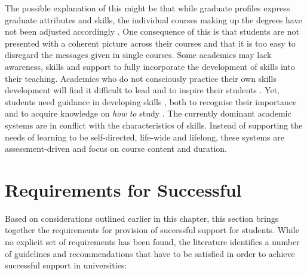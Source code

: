 The possible explanation of this might be that while graduate profiles express
graduate attributes and \LLLs skills, the individual courses making up the
degrees have not been adjusted accordingly \citep{Hughes2010}. One consequence
of this is that students are not presented with a coherent picture across their
courses and that it is too easy to disregard the messages given in single
courses. Some academics may lack awareness, skills and support to fully
incorporate the development of \LLLs skills into their teaching. Academics who
do not consciously practice their own \LLLs skills development will find it
difficult to lead and to inspire their students \citep{Linden2003}. Yet,
students need guidance in developing \LLLs skills \citep{Leone2019}, both to
recognise their importance and to acquire knowledge on \textit{how to} study
\citep{Medel-Anonuevo2001}. The currently dominant academic systems are in
conflict with the characteristics of \LLLs skills. Instead of supporting the
needs of learning to be self-directed, life-wide and lifelong, these systems are
assessment-driven and focus on course content and duration.

\section{Requirements for Successful \LLLc}
\label{sec:needs}
Based on considerations outlined earlier in this chapter, this section brings
together the requirements for provision of successful \LLLs support for
students. While no explicit set of requirements has been found, the
literature identifies a number of guidelines and recommendations that have to be
satisfied in order to achieve successful \LLLs support in universities:
 
